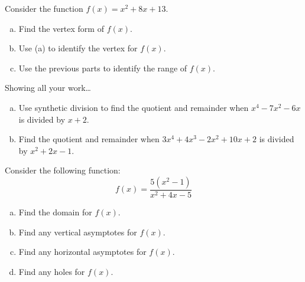 \documentclass[12pt,letterpaper]{exam}
\begin{document}
\begin{questions}
\newpage
{} \par\vspace{0.3cm}

Consider the function $f(x)= x^2 + 8x + 13$.
	\begin{enumerate}[(a)]
	\item Find the vertex form of $f(x)$. \vfill
	\item Use (a) to identify the vertex for $f(x)$. \vfill
	\item Use the previous parts to identify the range of $f(x)$. \vfill
	\end{enumerate}



\newpage
{} \par\vspace{0.3cm}

Showing all your work\dots
	\begin{enumerate}[(a)]
	\item Use synthetic division to find the quotient and remainder when $x^4 - 7x^2 - 6x$ is divided by $x + 2$. \vfill
	\item Find the quotient and remainder when $3x^4 + 4x^3 - 2x^2 + 10x + 2$ is divided by $x^2 + 2x - 1$. \vfill
	\end{enumerate}



\newpage
{} \par\vspace{0.3cm}

Consider the following function:
	\[
	f(x)= \dfrac{5(x^2 - 1)}{x^2 + 4x - 5}
	\] \pspace
	
\begin{enumerate}[(a)]
\item Find the domain for $f(x)$. \vfill
\item Find any vertical asymptotes for $f(x)$. \vfill
\item Find any horizontal asymptotes for $f(x)$. \vfill
\item Find any holes for $f(x)$. \vfill
\end{enumerate}




\end{questions}
\end{document}
